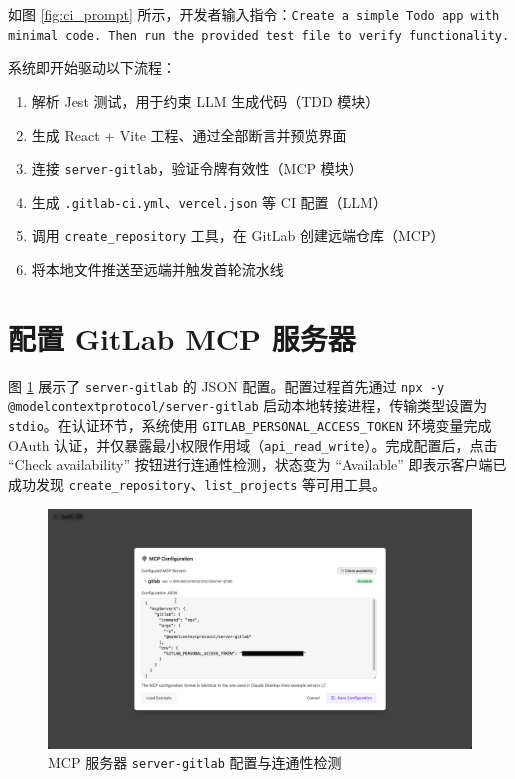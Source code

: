 如图 \ref{fig:ci_prompt} 所示，开发者输入指令：\texttt{Create a simple Todo app with minimal code. Then run the provided test file to verify functionality.}

系统即开始驱动以下流程：

\begin{enumerate}
  \item 解析 Jest 测试，用于约束 LLM 生成代码（TDD 模块）
  \item 生成 React + Vite 工程、通过全部断言并预览界面
  \item 连接 \texttt{server-gitlab}，验证令牌有效性（MCP 模块）
  \item 生成 \texttt{.gitlab-ci.yml}、\texttt{vercel.json} 等 CI 配置（LLM）
  \item 调用 \texttt{create\_repository} 工具，在 GitLab 创建远端仓库（MCP）
  \item 将本地文件推送至远端并触发首轮流水线
\end{enumerate}

\section{配置 GitLab MCP 服务器}
\label{sec:cicd-mcp-config}

图 \ref{fig:mcp_gitlab_cfg} 展示了 \texttt{server-gitlab} 的 JSON 配置。配置过程首先通过 \texttt{npx -y @modelcontextprotocol/server-gitlab} 启动本地转接进程，传输类型设置为 \texttt{stdio}。在认证环节，系统使用 \texttt{GITLAB\_PERSONAL\_ACCESS\_TOKEN} 环境变量完成 OAuth 认证，并仅暴露最小权限作用域（\texttt{api\_read\_write}）。完成配置后，点击 “Check availability” 按钮进行连通性检测，状态变为 “Available” 即表示客户端已成功发现 \texttt{create\_repository}、\texttt{list\_projects} 等可用工具。

\begin{figure}[H]
  \centering
  \includegraphics[width=\textwidth]{figures/screenshots/ci-cd/mcp_gitlab_cfg.png}
  \caption{MCP 服务器 \texttt{server-gitlab} 配置与连通性检测}
  \label{fig:mcp_gitlab_cfg}
\end{figure}

